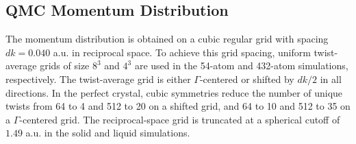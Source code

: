 \documentclass[aps,prl,superscriptaddress]{revtex4-1}
\begin{document}
\subsection{QMC Momentum Distribution}

The momentum distribution is obtained on a cubic regular grid with spacing $dk=0.040$ a.u. in reciprocal space. To achieve this grid spacing, uniform twist-average grids of size $8^3$ and $4^3$ are used in the 54-atom and 432-atom simulations, respectively. The twist-average grid is either $\Gamma$-centered or shifted by $dk/2$ in all directions. In the perfect crystal, cubic symmetries reduce the number of unique twists from 64 to 4 and 512 to 20 on a shifted grid, and 64 to 10 and 512 to 35 on a $\Gamma$-centered grid. The reciprocal-space grid is truncated at a spherical cutoff of $1.49$ a.u. in the solid and liquid simulations.
\end{document}
